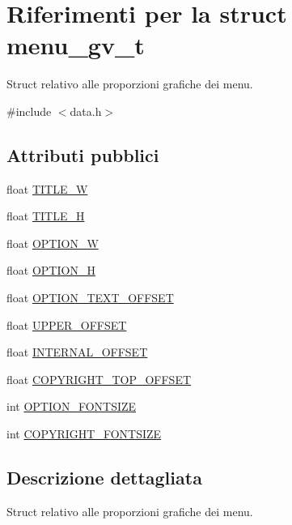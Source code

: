 \hypertarget{structmenu__gv__t}{}\section{Riferimenti per la struct menu\+\_\+gv\+\_\+t}
\label{structmenu__gv__t}


Struct relativo alle proporzioni grafiche dei menu.  




{\ttfamily \#include $<$data.\+h$>$}

\subsection*{Attributi pubblici}
\begin{DoxyCompactItemize}
\item 
float \hyperlink{structmenu__gv__t_a7cf277c4c126a01f39530b8a300d5690}{T\+I\+T\+L\+E\+\_\+W}
\item 
float \hyperlink{structmenu__gv__t_a1dcadff576fe5d278358d5ea4a1bec46}{T\+I\+T\+L\+E\+\_\+H}
\item 
float \hyperlink{structmenu__gv__t_a07c8daa7cb54edde6f6ff17dbb5af65f}{O\+P\+T\+I\+O\+N\+\_\+W}
\item 
float \hyperlink{structmenu__gv__t_a75a9a5ce643a4eefad6dc1903e8b3031}{O\+P\+T\+I\+O\+N\+\_\+H}
\item 
float \hyperlink{structmenu__gv__t_a74a3a119051b0f6164b8d29df1c1971a}{O\+P\+T\+I\+O\+N\+\_\+\+T\+E\+X\+T\+\_\+\+O\+F\+F\+S\+ET}
\item 
float \hyperlink{structmenu__gv__t_aebfbc33062d5d5dd6f9d220763dc0a99}{U\+P\+P\+E\+R\+\_\+\+O\+F\+F\+S\+ET}
\item 
float \hyperlink{structmenu__gv__t_a0512be0cfc8e7c078b0a4d758fb56abf}{I\+N\+T\+E\+R\+N\+A\+L\+\_\+\+O\+F\+F\+S\+ET}
\item 
float \hyperlink{structmenu__gv__t_abe36447c1aaedef6dea8e52187413024}{C\+O\+P\+Y\+R\+I\+G\+H\+T\+\_\+\+T\+O\+P\+\_\+\+O\+F\+F\+S\+ET}
\item 
int \hyperlink{structmenu__gv__t_a88a064d8fb8ce498d5af6bd13aee0a3e}{O\+P\+T\+I\+O\+N\+\_\+\+F\+O\+N\+T\+S\+I\+ZE}
\item 
int \hyperlink{structmenu__gv__t_a2a4d398685066a02a54f67bba3c2280a}{C\+O\+P\+Y\+R\+I\+G\+H\+T\+\_\+\+F\+O\+N\+T\+S\+I\+ZE}
\end{DoxyCompactItemize}


\subsection{Descrizione dettagliata}
Struct relativo alle proporzioni grafiche dei menu. 

